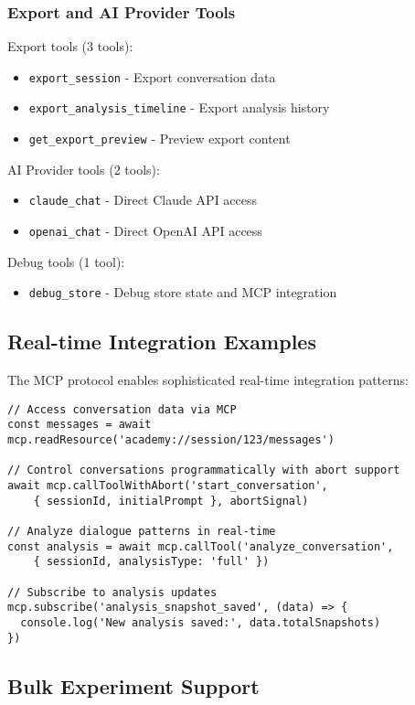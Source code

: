 \documentclass[11pt,letterpaper]{article}
\begin{document}
\subsubsection{Export and AI Provider Tools}
Export tools (3 tools):
\begin{itemize}
    \item \texttt{export\_session} - Export conversation data
    \item \texttt{export\_analysis\_timeline} - Export analysis history
    \item \texttt{get\_export\_preview} - Preview export content
\end{itemize}

AI Provider tools (2 tools):
\begin{itemize}
    \item \texttt{claude\_chat} - Direct Claude API access
    \item \texttt{openai\_chat} - Direct OpenAI API access
\end{itemize}

Debug tools (1 tool):
\begin{itemize}
    \item \texttt{debug\_store} - Debug store state and MCP integration
\end{itemize}

\subsection{Real-time Integration Examples}

The MCP protocol enables sophisticated real-time integration patterns:

\begin{verbatim}
// Access conversation data via MCP
const messages = await mcp.readResource('academy://session/123/messages')

// Control conversations programmatically with abort support
await mcp.callToolWithAbort('start_conversation', 
    { sessionId, initialPrompt }, abortSignal)

// Analyze dialogue patterns in real-time
const analysis = await mcp.callTool('analyze_conversation', 
    { sessionId, analysisType: 'full' })

// Subscribe to analysis updates
mcp.subscribe('analysis_snapshot_saved', (data) => {
  console.log('New analysis saved:', data.totalSnapshots)
})
\end{verbatim}

\subsection{Bulk Experiment Support}
\end{document}
